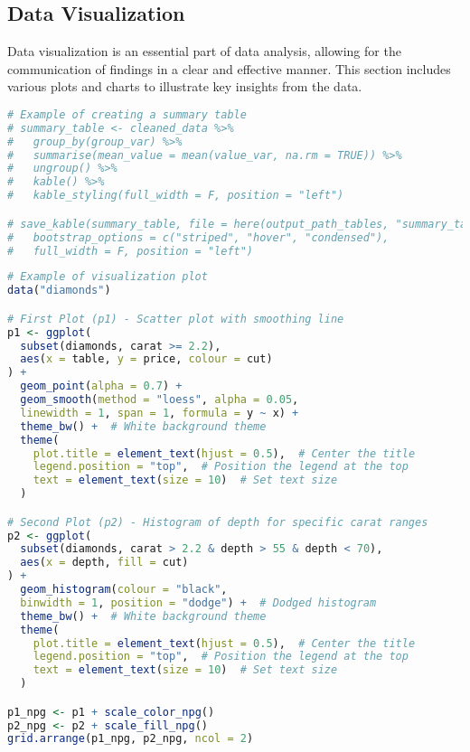 \documentclass[
  12pt,
]{article}
\begin{document}
\subsection{Data Visualization}\label{data-visualization}

Data visualization is an essential part of data analysis, allowing for
the communication of findings in a clear and effective manner. This
section includes various plots and charts to illustrate key insights
from the data.

\begin{lstlisting}[language=R]
# Example of creating a summary table 
# summary_table <- cleaned_data %>%
#   group_by(group_var) %>%
#   summarise(mean_value = mean(value_var, na.rm = TRUE)) %>%
#   ungroup() %>%
#   kable() %>%
#   kable_styling(full_width = F, position = "left") 

# save_kable(summary_table, file = here(output_path_tables, "summary_table.html"),
#   bootstrap_options = c("striped", "hover", "condensed"),
#   full_width = F, position = "left")
\end{lstlisting}

\begin{lstlisting}[language=R]
# Example of visualization plot
data("diamonds")

# First Plot (p1) - Scatter plot with smoothing line
p1 <- ggplot(
  subset(diamonds, carat >= 2.2),
  aes(x = table, y = price, colour = cut)
) +
  geom_point(alpha = 0.7) +  
  geom_smooth(method = "loess", alpha = 0.05,
  linewidth = 1, span = 1, formula = y ~ x) +  
  theme_bw() +  # White background theme
  theme(
    plot.title = element_text(hjust = 0.5),  # Center the title
    legend.position = "top",  # Position the legend at the top
    text = element_text(size = 10)  # Set text size
  )

# Second Plot (p2) - Histogram of depth for specific carat ranges
p2 <- ggplot(
  subset(diamonds, carat > 2.2 & depth > 55 & depth < 70),
  aes(x = depth, fill = cut)
) +
  geom_histogram(colour = "black",
  binwidth = 1, position = "dodge") +  # Dodged histogram
  theme_bw() +  # White background theme
  theme(
    plot.title = element_text(hjust = 0.5),  # Center the title
    legend.position = "top",  # Position the legend at the top
    text = element_text(size = 10)  # Set text size
  )

p1_npg <- p1 + scale_color_npg()
p2_npg <- p2 + scale_fill_npg()
grid.arrange(p1_npg, p2_npg, ncol = 2)
\end{lstlisting}
\end{document}
